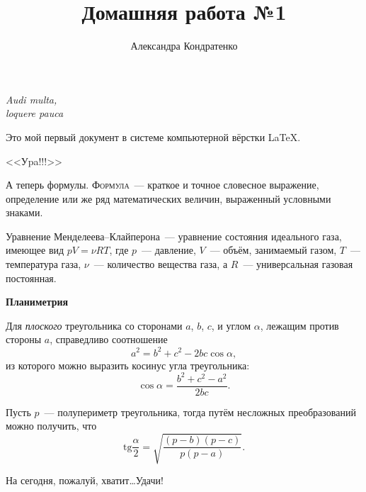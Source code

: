 \documentclass[12pt]{article}
\title{Домашняя работа №1}
\author{Александра Кондратенко}
\date{}
\begin{document}
	\maketitle
	\begin{flushright}
		\textit{
			Audi multa, \\
			loquere pauca
		}
	\end{flushright}
	
	\vspace{20pt}
	Это мой первый документ в системе компьютерной вёрстки \LaTeX.
	
	\begin{center}
	\textsf{
		\huge{
			<<Уpa!!!>>
		}
	}
	\end{center}
	
	А теперь формулы. \textsc{Формула}~--- краткое и точное словесное выражение, определение или же ряд математических величин, выраженный условными знаками. 
	\vspace*{15pt}
	
	
	Уравнение Менделеева--Клайперона~--- уравнение состояния идеального газа, имеющее вид $pV = \nu RT$, где $p$~--- давление, $V$~--- объём, занимаемый газом, $T$~--- температура газа, $\nu$~--- количество вещества газа, а $R$~--- универсальная газовая постоянная. 
	\vspace*{15pt}
	
	 \hfill {\Large\textrm{\textbf {Планиметрия}}}
	
	Для \textit{плоского} треугольника со сторонами $a$, $b$, $c$, и углом $\alpha$, лежащим против стороны $a$, справедливо соотношение
	$$
		a^2 = b^2 + c^2 - 2bc\cos\alpha, 
	$$
	из которого можно выразить косинус угла треугольника:
	$$
	\cos\alpha = \frac{b^2 + c^2 - a^2}{2bc}.
	$$
	
	Пусть $p$~--- полупериметр треугольника, тогда путём несложных преобразований можно получить, что 
	$$
		\mathrm{tg}\frac{\alpha}{2} = \sqrt{\frac{\left( p - b \right) \left( p - c \right)}{p \left( p - a \right)}}.
	$$
	
	\vspace{1cm}
	\begin{flushleft}
		На сегодня, пожалуй, хватит\dots Удачи!
	\end{flushleft}
\end{document}
